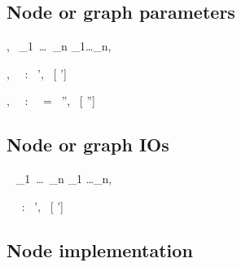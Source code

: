\subsection{Node or graph parameters}
\label{sec:typing-node-or-graph-params}


{\TE,\VE~ \vdash {}_1~\ldots~_n \gives \tau_1\times\ldots\times\tau_n,~ }


{\TE,\VE~\vdash {} ~:~ \ty \gives \tau',~ [ \mapsto \tau']}

{\TE,\VE~\vdash {} ~:~ \ty ~=~  \gives \tau'',~ [ \mapsto \tau'']}

\subsection{Node or graph IOs}
\label{sec:typing-node-or-graph-ios}

\medskip{}

{\TE~ \vdash {}_1~\ldots~_n \gives \tau_1 \times \ldots \times \tau_n,~ }

\medskip{}

{\TE~\vdash {} ~:~ \ty \gives \tau',~ [ \mapsto \tau']}

\medskip{}

\subsection{Node implementation}
\label{sec:typing-node-impl}


